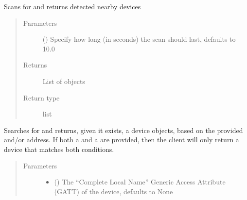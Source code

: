 \documentclass[letterpaper,10pt,english]{sphinxmanual}
\begin{document}
\begin{fulllineitems}
\begin{fulllineitems}
\label{\detokenize{simpleble:simpleble.SimpleBleClient.scan}}
Scans for and returns detected nearby devices
\begin{quote}\begin{description}
\item[{Parameters}] \leavevmode
{} (\sphinxstyleliteralemphasis{\sphinxupquote{, }}) \textendash{} Specify how long (in seconds) the scan should last, defaults to 10.0

\item[{Returns}] \leavevmode
List of {\hyperref[\detokenize{simpleble:simpleble.SimpleBleDevice}]{}} objects

\item[{Return type}] \leavevmode
list

\end{description}\end{quote}

\end{fulllineitems}


\begin{fulllineitems}
\label{\detokenize{simpleble:simpleble.SimpleBleClient.searchDevice}}
Searches for and returns, given it exists, a {\hyperref[\detokenize{simpleble:simpleble.SimpleBleDevice}]{}} device objects, based on the provided  and/or  address. If both a  and a  are provided, then the client will only return a device that matches both conditions.
\begin{quote}\begin{description}
\item[{Parameters}] \leavevmode\begin{itemize}
\item {} 
 (\sphinxstyleliteralemphasis{\sphinxupquote{, }}) \textendash{} The “Complete Local Name” Generic Access Attribute (GATT) of the device, defaults to None


\end{itemize}
\end{description}
\end{quote}
\end{fulllineitems}
\end{fulllineitems}
\end{document}
